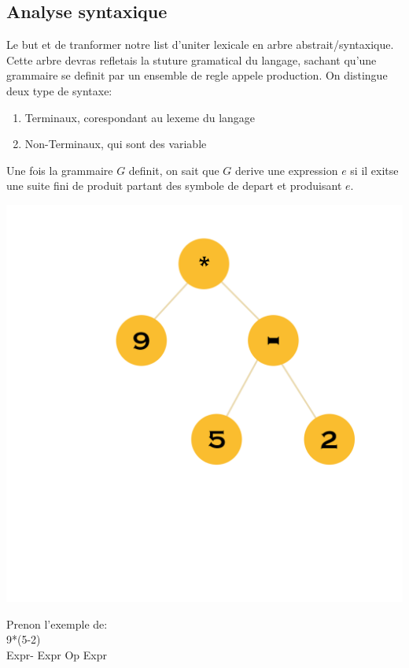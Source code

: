 \documentclass[a4paper,11pt]{article}
\begin{document}
      \subsection{Analyse syntaxique}
      Le but et de tranformer notre list d'uniter lexicale en arbre abstrait/syntaxique. Cette arbre devras refletais la stuture gramatical du langage, sachant qu'une grammaire se definit par un ensemble de regle appele production.
      On distingue deux type de syntaxe:\\
      \begin{enumerate}
        \item Terminaux, corespondant au lexeme du langage
        \item Non-Terminaux, qui sont des variable
      \end{enumerate}
      Une fois la grammaire $G$ definit, on sait que $G$ derive une expression $e$ si il exitse une suite fini de produit partant des symbole de depart et produisant $e$.\\
   \noindent\begin{minipage}{0.4\textwidth}%
    \includegraphics[width=\linewidth]{grap.png}
    \end{minipage}%
  \hfill%
  \begin{minipage}{0.5\textwidth}\raggedleft
    Prenon l'exemple de:\\
      9*(5-2)\\
      Expr-\> Expr Op Expr\\
  \end{minipage}
\end{document}
